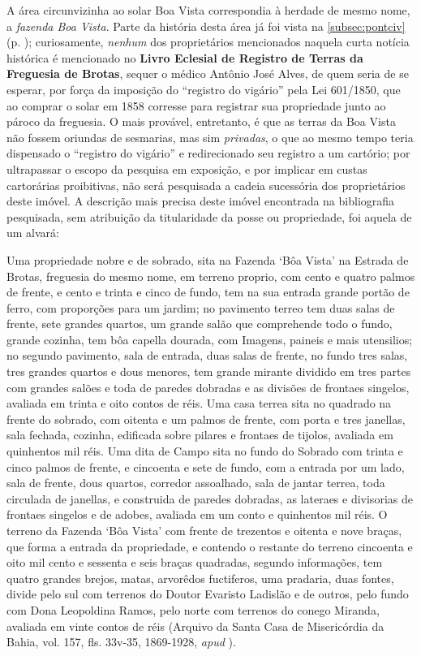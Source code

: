 A área circunvizinha ao solar Boa Vista correspondia à herdade de mesmo nome, a \textit{fazenda Boa Vista}. Parte da história desta área já foi vista na \autoref{subsec:pontciv} (p. \pageref{subsec:pontciv}); curiosamente, \textit{nenhum} dos proprietários mencionados naquela curta notícia histórica é mencionado no \textbf{Livro Eclesial de Registro de Terras da Freguesia de Brotas}, sequer o médico Antônio José Alves, de quem seria de se esperar, por força da imposição do ``registro do vigário'' pela Lei 601/1850, que ao comprar o solar em 1858 corresse para registrar sua propriedade junto ao pároco da freguesia. O mais provável, entretanto, é que as terras da Boa Vista não fossem oriundas de sesmarias, mas sim \textit{privadas}, o que ao mesmo tempo teria dispensado o ``registro do vigário'' e redirecionado seu registro a um cartório; por ultrapassar o escopo da pesquisa em exposição, e por implicar em custas cartorárias proibitivas, não será pesquisada a cadeia sucessória dos proprietários deste imóvel. A descrição mais precisa deste imóvel encontrada na bibliografia pesquisada, sem atribuição da titularidade da posse ou propriedade, foi aquela de um alvará: 

\begin{citacao}
Uma propriedade nobre e de sobrado, sita na Fazenda ‘Bôa Vista’ na Estrada de Brotas, freguesia do mesmo nome, em terreno proprio, com cento e quatro palmos de frente, e cento e trinta e cinco de fundo, tem na sua entrada grande portão de ferro, com proporções para um jardim; no pavimento terreo tem duas salas de frente, sete grandes quartos, um grande salão que comprehende todo o fundo, grande cozinha, tem bôa capella dourada, com Imagens, paineis e mais utensilios; no segundo pavimento, sala de entrada, duas salas de frente, no fundo tres salas, tres grandes quartos e dous menores, tem grande mirante dividido em tres partes com grandes salões e toda de paredes dobradas e as divisões de frontaes singelos, avaliada em trinta e oito contos de réis. Uma casa terrea sita no quadrado na frente do sobrado, com oitenta e um palmos de frente, com porta e tres janellas, sala fechada, cozinha, edificada sobre pilares e frontaes de tijolos, avaliada em quinhentos mil réis. Uma dita de Campo sita no fundo do Sobrado com trinta e cinco palmos de frente, e cincoenta e sete de fundo, com a entrada por um lado, sala de frente, dous quartos, corredor assoalhado, sala de jantar terrea, toda circulada de janellas, e construida de paredes dobradas, as lateraes e divisorias de frontaes singelos e de adobes, avaliada em um conto e quinhentos mil réis. O terreno da Fazenda ‘Bôa Vista’ com frente de trezentos e oitenta e nove braças, que forma a entrada da propriedade, e contendo o restante do terreno cincoenta e oito mil cento e sessenta e seis braças quadradas, segundo informações, tem quatro grandes brejos, matas, arvorêdos fuctiferos, uma pradaria, duas fontes, divide pelo sul com terrenos do Doutor Evaristo Ladislão e de outros, pelo fundo com Dona Leopoldina Ramos, pelo norte com terrenos do conego Miranda, avaliada em vinte contos de réis (Arquivo da Santa Casa de Misericórdia da Bahia, vol. 157, fls. 33v-35, 1869-1928, \textit{apud} ).
\end{citacao}

